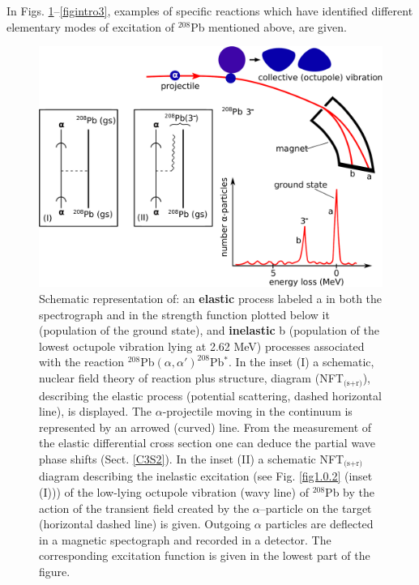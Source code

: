 In Figs. \ref{figintro1}--\ref{figintro3}, examples of specific reactions which have identified different elementary modes of excitation of $^{208}$Pb mentioned above, are given.
\begin{figure}
\centerline {
\includegraphics*[width=15cm]{introduccion/figs/figintro1}
}
\caption{Schematic representation of: an \textbf{elastic} process labeled a in both the spectrograph and in the strength function plotted below it (population of the ground state), and \textbf{inelastic} b (population of the lowest octupole vibration lying at 2.62 MeV) processes associated with the reaction $^{208}$Pb$(\alpha,\alpha')^{208}$Pb$^*$.  In the inset (I) a schematic, nuclear field theory of reaction plus structure,  diagram (NFT$_{\text{(s+r)}}$), describing  the elastic process (potential scattering, dashed horizontal line), is displayed. The $\alpha$-projectile moving in the continuum is represented by an arrowed (curved) line. From the measurement of the elastic differential cross section one can deduce the partial wave phase shifts (Sect. \ref{C3S2}). In the inset (II) a schematic NFT$_{\text{(s+r)}}$ diagram describing the inelastic  excitation (see Fig.  \ref{fig1.0.2} (inset (I))) of the low-lying octupole vibration (wavy line) of $^{208}$Pb by the action of the transient field created by the $\alpha$--particle on the target (horizontal dashed line) is given.  Outgoing $\alpha$ particles are deflected in a magnetic spectograph and recorded in a detector. The corresponding excitation function is given in the lowest part of the figure.}
\label{figintro1}
\end{figure}
